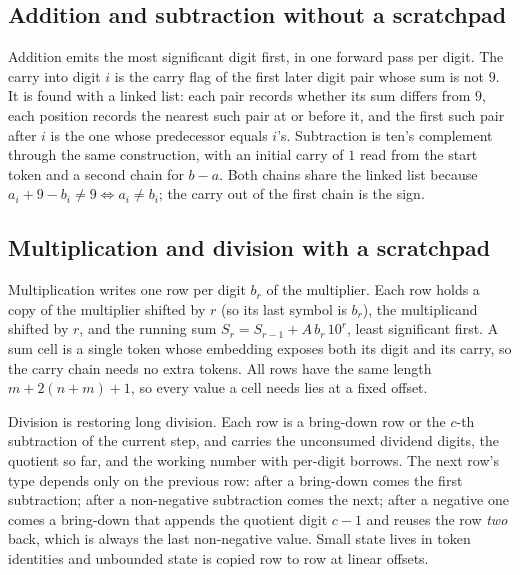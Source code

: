 \documentclass[10pt]{article}
\begin{document}
\subsection{Addition and subtraction without a scratchpad}
Addition emits the most significant digit first, in one forward pass per digit. The carry into
digit $i$ is the carry flag of the first later digit pair whose sum is not $9$. It is found with
a linked list: each pair records whether its sum differs from $9$, each position records the
nearest such pair at or before it, and the first such pair after $i$ is the one whose
predecessor equals $i$'s. Subtraction is ten's complement through the same construction, with
an initial carry of $1$ read from the start token and a second chain for $b-a$. Both chains share
the linked list because $a_i + 9 - b_i \neq 9 \iff a_i \neq b_i$; the carry out of the first chain
is the sign.

\subsection{Multiplication and division with a scratchpad}
Multiplication writes one row per digit $b_r$ of the multiplier. Each row holds a copy of the
multiplier shifted by $r$ (so its last symbol is $b_r$), the multiplicand shifted by $r$, and the
running sum $S_r = S_{r-1} + A\,b_r\,10^r$, least significant first. A sum cell is a single token
whose embedding exposes both its digit and its carry, so the carry chain needs no extra tokens.
All rows have the same length $m + 2(n+m) + 1$, so every value a cell needs lies at a fixed
offset.

Division is restoring long division. Each row is a bring-down row or the $c$-th subtraction of
the current step, and carries the unconsumed dividend digits, the quotient so far, and the
working number with per-digit borrows. The next row's type depends only on the previous row:
after a bring-down comes the first subtraction; after a non-negative subtraction comes the next;
after a negative one comes a bring-down that appends the quotient digit $c-1$ and reuses the row
\emph{two} back, which is always the last non-negative value. Small state lives in token
identities and unbounded state is copied row to row at linear offsets.
\end{document}

